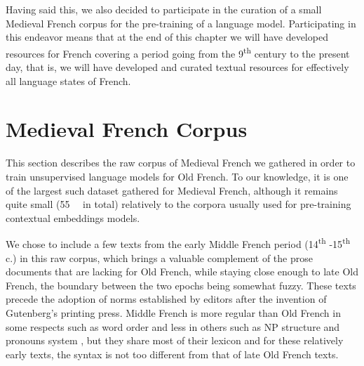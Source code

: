 Having said this, we also decided to participate in the curation of a small Medieval French corpus for the pre-training of a language model. Participating in this endeavor means that at the end of this chapter we will have developed resources for French covering a period going from the 9\textsuperscript{th} century to the present day, that is, we will have developed and curated textual resources for effectively all language states of French.

\section{Medieval French Corpus}
\label{sec-data}

This section describes the raw corpus of Medieval French we gathered in order to train unsupervised language models for Old French. To our knowledge, it is one of the largest such dataset gathered for Medieval French, although it remains quite small (\SI{55}{\mebi\byte} in total) relatively to the corpora usually used for pre-training contextual embeddings models.

We chose to include a few texts from the early Middle French period (14\textsuperscript{th} -15\textsuperscript{th}  c.) in this raw corpus, which brings a valuable complement of the prose documents that are lacking for Old French, while staying close enough to late Old French, the boundary between the two epochs being somewhat fuzzy. These texts precede the adoption of norms established by editors after the invention of Gutenberg's printing press. Middle French is more regular than Old French in some respects such as word order \citep{marchello-Nizia-etal-2020-grande} and less in others such as NP structure and pronouns system \citep{marchello-nizia-etal-1979-histoire}, but they share most of their lexicon and for these relatively early texts, the syntax is not too different from that of late Old French texts.

